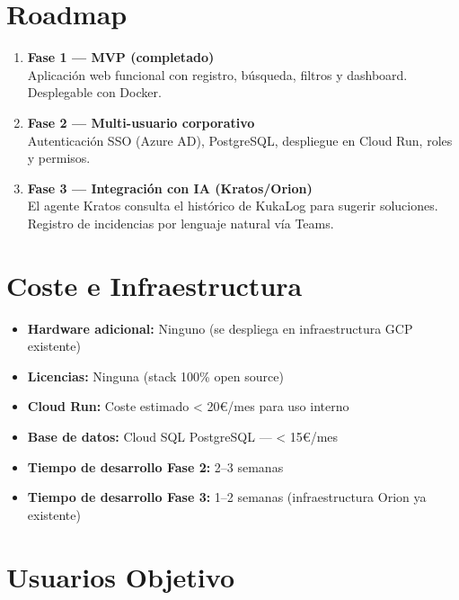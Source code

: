 \documentclass[11pt,a4paper]{article}
\begin{document}
\section{Roadmap}

\begin{warnbox}
\begin{enumerate}
    \item \textbf{Fase 1 --- MVP (completado)} \\
    Aplicación web funcional con registro, búsqueda, filtros y dashboard. Desplegable con Docker.

    \item \textbf{Fase 2 --- Multi-usuario corporativo} \\
    Autenticación SSO (Azure AD), PostgreSQL, despliegue en Cloud Run, roles y permisos.

    \item \textbf{Fase 3 --- Integración con IA (Kratos/Orion)} \\
    El agente Kratos consulta el histórico de KukaLog para sugerir soluciones. Registro de incidencias por lenguaje natural vía Teams.
\end{enumerate}
\end{warnbox}

\section{Coste e Infraestructura}

\begin{infobox}
\begin{itemize}[noitemsep]
    \item \textbf{Hardware adicional:} Ninguno (se despliega en infraestructura GCP existente)
    \item \textbf{Licencias:} Ninguna (stack 100\% open source)
    \item \textbf{Cloud Run:} Coste estimado < 20€/mes para uso interno
    \item \textbf{Base de datos:} Cloud SQL PostgreSQL --- < 15€/mes
    \item \textbf{Tiempo de desarrollo Fase 2:} 2--3 semanas
    \item \textbf{Tiempo de desarrollo Fase 3:} 1--2 semanas (infraestructura Orion ya existente)
\end{itemize}
\end{infobox}

\section{Usuarios Objetivo}
\end{document}
